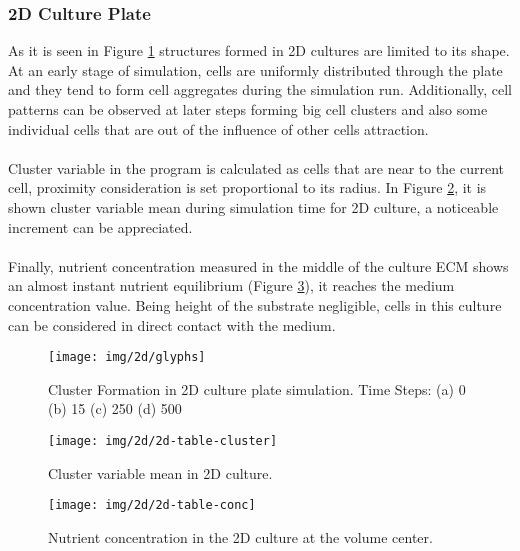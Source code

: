 \subsubsection{2D Culture Plate}
As it is seen in Figure \ref{fig:2d-glyphs} structures formed in 2D cultures are limited to its shape. At an early stage of simulation, cells are uniformly distributed through the plate and they tend to form cell aggregates during the simulation run. Additionally, cell patterns can be observed at later steps forming big cell clusters and also some individual cells that are out of the influence of other cells attraction.\\ 
\\
Cluster variable in the program is calculated as cells that are near to the current cell, proximity consideration is set proportional to its radius. In Figure \ref{fig:2d-table-cluster}, it is shown cluster variable mean during simulation time for 2D culture, a noticeable increment can be appreciated.\\
\\
Finally, nutrient concentration measured in the middle of the culture ECM shows an almost instant nutrient equilibrium (Figure \ref{fig:2d-table-conc}), it reaches the medium concentration value. Being height of the substrate negligible, cells in this culture can be considered in direct contact with the medium.

\begin{figure}[H]
\centering
\setlength\fboxsep{0pt}
\setlength\fboxrule{0.5pt}
\texttt{[image: img/2d/glyphs]}
\caption{Cluster Formation in 2D culture plate simulation. Time Steps: (a) 0 (b) 15 (c) 250 (d) 500}
\label{fig:2d-glyphs}
\end{figure}

\begin{figure}[H]
\centering
\setlength\fboxsep{0pt}
\setlength\fboxrule{0.5pt}
\texttt{[image: img/2d/2d-table-cluster]}
\caption{Cluster variable mean in 2D culture.}
\label{fig:2d-table-cluster}
\end{figure}

\begin{figure}[H]
\centering
\setlength\fboxsep{0pt}
\setlength\fboxrule{0.5pt}
\texttt{[image: img/2d/2d-table-conc]}
\caption{Nutrient concentration in the 2D culture at the volume center.}
\label{fig:2d-table-conc}
\end{figure}

\newpage
